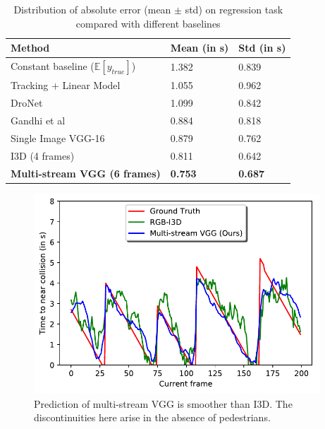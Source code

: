 \begin{table}[ht]
\caption {Distribution of absolute error (mean $\pm$ std) on regression task compared with different baselines} \label{tab:baselines} 
\begin{tabular}{|P{6cm}|P{3cm}|P{2.25cm}|} \hline
Method  &  Mean (in s) & Std (in s)\\ \hline
Constant baseline ($\mathbb{E}[y_{true}]$) & 1.382 & 0.839\\ \hline 
Tracking + Linear Model \cite{BBeep} &  1.055  & 0.962 \\ \hline 
DroNet \cite{DroNet} & 1.099 &  0.842  \\ \hline 
Gandhi et al \cite{gandhi} & 0.884 & 0.818 \\ \hline
Single Image VGG-16 & 0.879  & 0.762 \\ \hline
I3D (4 frames) \cite{i3d} & 0.811  & 0.642  \\ \hline
\textbf{Multi-stream VGG (6 frames)} & \textbf{0.753}  & \textbf{0.687}  \\ \hline 
\end{tabular}
\end{table}

  \begin{figure}[ht]
      \centering
      \includegraphics[height=7.5cm, width=\textwidth]{figs/400_new.pdf}
      \caption{Prediction of multi-stream VGG is smoother than I3D. The discontinuities here arise in the absence of pedestrians.}
      \label{fig:plot}
  \end{figure}
  

